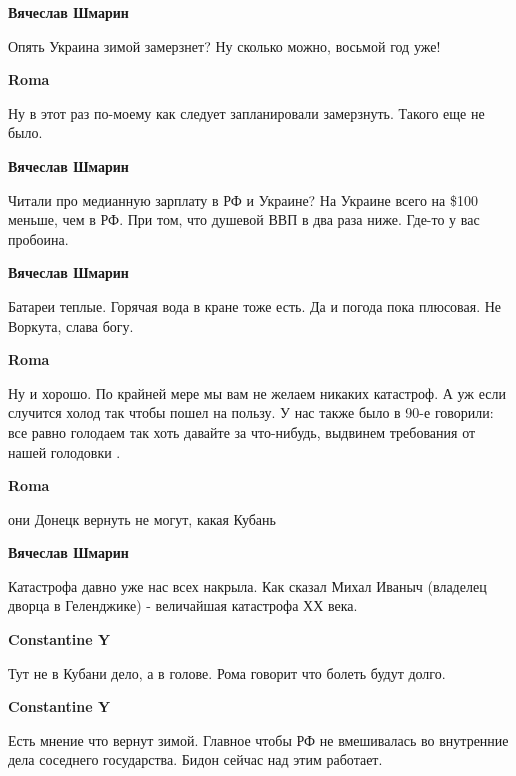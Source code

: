 \begin{itemize}
\textbf{Вячеслав Шмарин}

Опять Украина зимой замерзнет? Ну сколько можно, восьмой год уже!

\textbf{Roma}

Ну в этот раз по-моему как следует запланировали замерзнуть. Такого еще не было.

\textbf{Вячеслав Шмарин}

Читали про медианную зарплату в РФ и Украине? На Украине всего на \$100  меньше,
чем в РФ. При том, что душевой ВВП в два раза ниже. Где-то у вас пробоина.

\textbf{Вячеслав Шмарин}

Батареи теплые. Горячая вода в кране тоже есть. Да и погода пока плюсовая. Не
Воркута, слава богу.

\textbf{Roma}

Ну и хорошо. По крайней мере мы вам не желаем никаких катастроф. А уж если
случится холод так чтобы пошел на пользу. У нас также было в 90-е говорили: все
равно голодаем так хоть давайте за что-нибудь, выдвинем требования от нашей
голодовки .

\textbf{Roma}

они Донецк вернуть не могут, какая Кубань

\textbf{Вячеслав Шмарин}

Катастрофа давно уже нас всех накрыла. Как сказал Михал Иваныч (владелец дворца
в Геленджике) - величайшая катастрофа ХХ века.

\textbf{Constantine Y}

Тут не в Кубани дело, а в голове. Рома говорит что болеть будут долго.

\textbf{Constantine Y}

Есть мнение что вернут зимой. Главное чтобы РФ не вмешивалась во внутренние
дела соседнего государства. Бидон сейчас над этим работает.

\end{itemize} %
